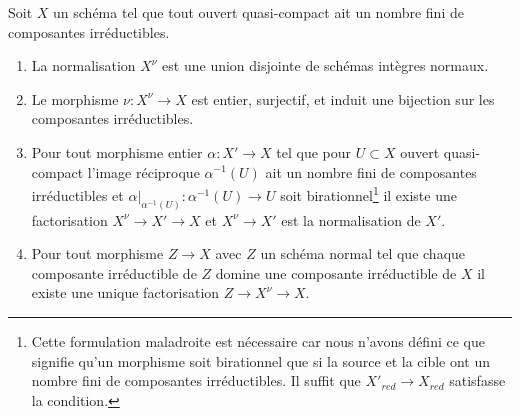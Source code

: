 \begin{lemma}
\label{lemma-normalization-normal}
Soit $X$ un schéma tel que tout ouvert quasi-compact ait un
nombre fini de composantes irréductibles.
\begin{enumerate}
\item La normalisation $X^\nu$ est une union disjointe de schémas intègres normaux.
\item Le morphisme $\nu : X^\nu \to X$ est entier, surjectif, et induit une
bijection sur les composantes irréductibles.
\item Pour tout morphisme entier $\alpha : X' \to X$ tel que pour $U \subset X$
ouvert quasi-compact l'image réciproque $\alpha^{-1}(U)$ ait un nombre fini
de composantes irréductibles et $\alpha|_{\alpha^{-1}(U)} : \alpha^{-1}(U) \to U$
soit birationnel\footnote{Cette formulation maladroite est
nécessaire car nous n'avons défini ce que signifie qu'un
morphisme soit birationnel que si la source et la cible ont
un nombre fini de composantes irréductibles. Il suffit
que $X'_{red} \to X_{red}$ satisfasse la condition.}
il existe une factorisation
$X^\nu \to X' \to X$ et $X^\nu \to X'$ est la normalisation de $X'$.
\item Pour tout morphisme $Z \to X$ avec $Z$ un schéma normal
tel que chaque composante irréductible de $Z$ domine une composante
irréductible de $X$ il existe une unique factorisation $Z \to X^\nu \to X$.
\end{enumerate}
\end{lemma}

